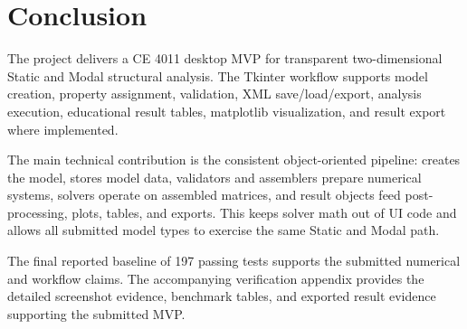 \section{Conclusion}

The project delivers a CE 4011 desktop MVP for transparent two-dimensional Static and Modal structural analysis. The Tkinter workflow supports model creation, property assignment, validation, XML save/load/export, analysis execution, educational result tables, matplotlib visualization, and result export where implemented.

The main technical contribution is the consistent object-oriented pipeline:  creates the model,  stores model data, validators and assemblers prepare numerical systems, solvers operate on assembled matrices, and result objects feed post-processing, plots, tables, and exports. This keeps solver math out of UI code and allows all submitted model types to exercise the same Static and Modal path.

The final reported baseline of 197 passing tests supports the submitted numerical and workflow claims. The accompanying verification appendix provides the detailed screenshot evidence, benchmark tables, and exported result evidence supporting the submitted MVP.
